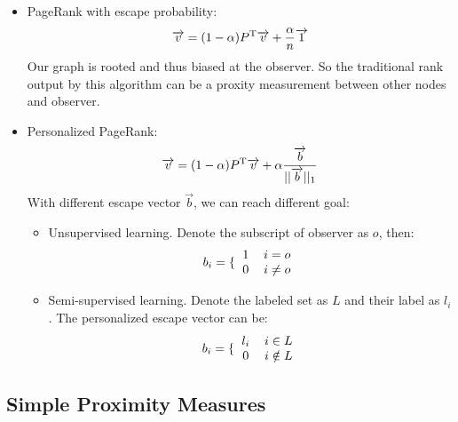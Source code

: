 \documentclass[11pt,a4paper]{article}
\begin{document}
		\begin{itemize}
			\item PageRank with escape probability:
			\begin{equation}
				\overrightarrow{v} = (1-\alpha)P^{\rm T}\overrightarrow{v}
				+ \frac{\alpha}{n}\overrightarrow{1}
			\end{equation}
			Our graph is rooted and thus biased at the observer. So the 
			traditional rank output by this algorithm can be a proxity 
			measurement between other nodes and observer. 
			\item Personalized PageRank:
			\begin{equation}
				\overrightarrow{v} = (1-\alpha)P^{\rm T}\overrightarrow{v}
				+ \alpha\frac{\overrightarrow{b}}{||\overrightarrow{b}||_1}
			\end{equation}
			With different escape vector $\overrightarrow{b}$, we can reach 
			different goal:
				\begin{itemize}
					\item Unsupervised learning. Denote the subscript of observer
					as $o$, then:
					\begin{equation}
						b_i=\lbrace{\begin{tabular}{cc}
							1 & $i=o$ \\
							0 & $i\neq o$ 
						\end{tabular}}
					\end{equation}
					\item Semi-supervised learning. Denote the labeled set as 
					$L$ and their label as $l_i$. The personalized escape 
					vector can be:
					\begin{equation}
						b_i=\lbrace{\begin{tabular}{cc}
							$l_i$ & $i \in L $ \\
							$0$ & $i\notin L $ 
						\end{tabular}}
					\end{equation}
				\end{itemize}

		\end{itemize}  
		
\subsection{Simple Proximity Measures}
\end{document}
